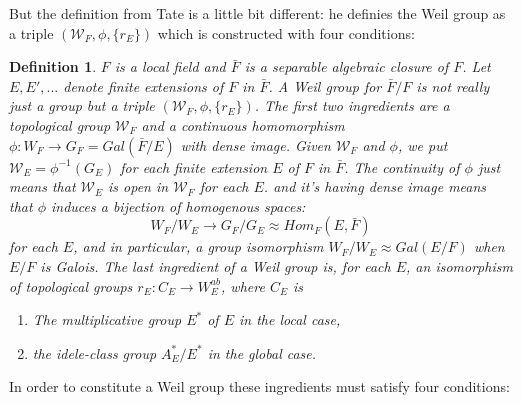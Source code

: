 \documentclass{article}
\theoremstyle{theorem}
\newtheorem{defe}{Definition}
\begin{document}
But the definition from Tate is a little bit different: he definies the Weil group as a triple $(\mathcal{W}_{F},\phi,\{r_{E}\})$ which is constructed with four conditions:
\begin{defe}
$F$ is a local field and $\bar{F}$ is a separable algebraic closure of $F$. Let $E, E',...$ denote finite extensions of $F$ in $\bar{F}$. A Weil group for $\bar{F}/F$ is not really just a group but a triple $(\mathcal{W}_{F},\phi,\{r_{E}\})$. The first two ingredients are a topological group $\mathcal{W}_{F}$ and a continuous homomorphism $\phi: W_{F}\rightarrow G_{F}=Gal(\bar{F}/E)$ with dense image. Given $\mathcal{W}_{F}$ and $\phi$, we put $\mathcal{W}_{E}=\phi^{-1}(G_{E})$ for each finite extension $E$ of $F$ in $\bar{F}$. The continuity of $\phi$ just means that $\mathcal{W}_{E}$ is open in $\mathcal{W}_{F}$ for each $E$. and it's having dense image means that $\phi$ induces a bijection of homogenous spaces:
\begin{equation*}
    W_{F}/W_{E}\rightarrow G_{F}/G_{E}\approx Hom_{F}(E,\bar{F})
\end{equation*}
for each $E$, and in particular, a group isomorphism $W_{F}/W_{E}\approx Gal(E/F)$ when $E/F$ is Galois. The last ingredient of a Weil group is, for each $E$, an isomorphism of topological groups $r_{E}:C_{E}\rightarrow W^{ab}_{E}$, where
$C_{E}$ is 
\begin{enumerate}
    \item The multiplicative group $E^{*}$ of $E$ in the local case,
    \item the idele-class group $A^{*}_{E}/E^{*}$ in the global case.
\end{enumerate}
\end{defe}
In order to constitute a Weil group these ingredients must satisfy four conditions:
\end{document}

